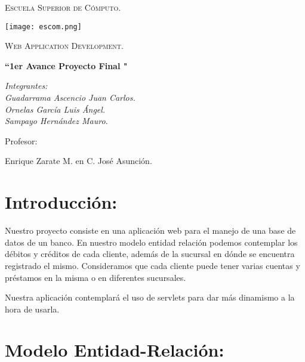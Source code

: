 \documentclass[titlepage, 12pt]{article}
\begin{document}
\begin{titlepage}

	\centering
	{\scshape\LARGE Escuela Superior de Cómputo. \par}
	\vspace{1cm}
	
	\texttt{[image: escom.png]}\par\vspace{1cm}
	
	{\scshape\Large Web Application Development.\par}
	\vspace{1cm}
	
	{\Large\bfseries ``1er Avance Proyecto Final "\par}
	\vspace{1cm}
	
    {\Large\itshape Integrantes:  \\ Guadarrama Ascencio Juan Carlos. \\ Ornelas García Luis Ángel. \\ Sampayo Hernández Mauro. \par}
	\vspace{1cm}
	
	\vfill
	Profesor:\par
	Enrique Zarate M. en C. José Asunción.
	\vfill
	
\end{titlepage}

\tableofcontents

\newpage

\listoffigures

\newpage

\section{Introducción:}

Nuestro proyecto consiste en una aplicación web para el manejo de una base de datos de un banco. En nuestro modelo entidad relación podemos contemplar los débitos y créditos de cada cliente, además de la sucursal en dónde se encuentra registrado el mismo. Consideramos que cada cliente puede tener varias cuentas y préstamos en la misma o en diferentes sucursales. \par\vspace{0.5cm}

Nuestra aplicación contemplará el uso de servlets para dar más dinamismo a la hora de usarla.

\section{Modelo Entidad-Relación:}
\end{document}
